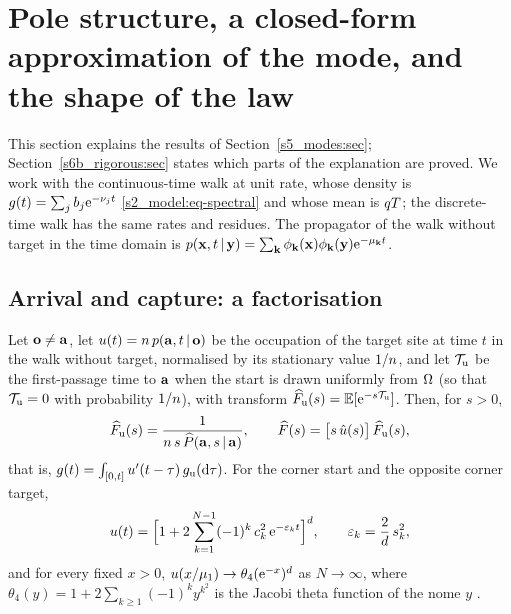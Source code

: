 \section{Pole structure, a closed-form approximation of the mode, and the shape of the law}\label{s6_mechanism:sec}

This section explains the results of Section~\ref{s5_modes:sec}; Section~\ref{s6b_rigorous:sec} states which parts of
the explanation are proved. We work with the continuous-time walk at unit rate, whose density is
$g(t)=\sum_j b_j\mathrm{e}^{-\nu_j t}$ \eqref{s2_model:eq-spectral} and whose mean is $qT$; the discrete-time walk has the same
rates and residues. The propagator of the walk without target in the time domain is
$p(\mathbf{x},t\,|\,\mathbf{y})=\sum_{\mathbf{k}}\phi_{\mathbf{k}}(\mathbf{x})\phi_{\mathbf{k}}(\mathbf{y})\mathrm{e}^{-\mu_{\mathbf{k}}t}$.

\subsection{Arrival and capture: a factorisation}\label{s6_mechanism:ssec-factor}

\begin{proposition}\label{s6_mechanism:prop-factorisation}
Let $\mathbf{o}\neq\mathbf{a}$, let $u(t)=n\,p(\mathbf{a},t\,|\,\mathbf{o})$ be the occupation of the target site at time $t$ in the walk
without target, normalised by its stationary value $1/n$, and let $\mathcal{T}_{\mathrm u}$ be the first-passage time to
$\mathbf{a}$ when the start is drawn uniformly from $\Omega$ (so that $\mathcal{T}_{\mathrm u}=0$ with probability $1/n$), with
transform $\widehat{F}_{\mathrm u}(s)=\mathbb{E}[\mathrm{e}^{-s\mathcal{T}_{\mathrm u}}]$. Then, for $s>0$,
\begin{equation}\label{s6_mechanism:eq-factor}
  \widehat{F}_{\mathrm u}(s)=\frac{1}{n\,s\,\widehat{P}(\mathbf{a},s\,|\,\mathbf{a})},\qquad
  \widehat{F}(s)=\bigl[s\,\hat u(s)\bigr]\,\widehat{F}_{\mathrm u}(s),
\end{equation}
that is, $g(t)=\int_{[0,t]}u'(t-\tau)\,g_{\mathrm u}(\mathrm{d}\tau)$. For the corner start and the opposite corner target,
\begin{equation}\label{s6_mechanism:eq-u}
  u(t)=\Bigl[1+2\sum_{k=1}^{N-1}(-1)^{k}\,c_{k}^{2}\,\mathrm{e}^{-\varepsilon_k t}\Bigr]^{d},\qquad
  \varepsilon_k=\frac{2}{d}\,s_{k}^{2},
\end{equation}
and for every fixed $x>0$, $u(x/\mu_{1})\to\theta_4(\mathrm{e}^{-x})^{d}$ as $N\to\infty$, where
$\theta_4(y)=1+2\sum_{k\ge1}(-1)^{k}y^{k^{2}}$ is the Jacobi theta function of the nome $y$ \citep[\S20.2]{DLMF}.
\end{proposition}

